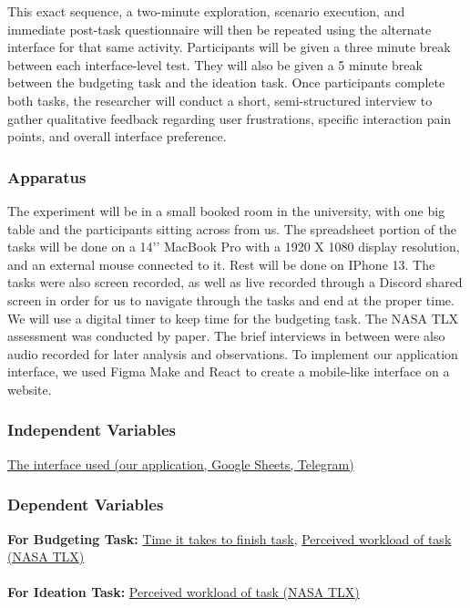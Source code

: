 \documentclass[12pt,a4paper]{article}
\begin{document}
\par
\indent
This exact sequence, a two-minute exploration, scenario execution, and immediate post-task questionnaire will then be repeated using the alternate interface for that same activity. Participants will be given a three minute break between each interface-level test. They will also be given a 5 minute break between the budgeting task and the ideation task. Once participants complete both tasks, the researcher will conduct a short, semi-structured interview to gather qualitative feedback regarding user frustrations, specific interaction pain points, and overall interface preference.


\subsubsection{Apparatus}

\par
\indent
The experiment will be in a small booked room in the university, with one big table and the participants sitting across from us. The spreadsheet portion of the tasks will be done on a 14’’ MacBook Pro with a 1920 X 1080 display resolution, and an external mouse connected to it. Rest will be done on IPhone 13. The tasks were also screen recorded, as well as live recorded through a Discord shared screen in order for us to navigate through the tasks and end at the proper time. We will use a digital timer to keep time for the budgeting task. The NASA TLX assessment was conducted by paper. The brief interviews in between were also audio recorded for later analysis and observations. To implement our application interface, we used Figma Make and React to create a mobile-like interface on a website.

\subsubsection{Independent Variables}
\noindent
\underline{The interface used (our application, Google Sheets, Telegram)}

\subsubsection{Dependent Variables}
\noindent
\textbf{For Budgeting Task:} \underline{Time it takes to finish task}, \underline{Perceived workload of task (NASA TLX)}
\\
\\
\textbf{For Ideation Task:}  \underline{Perceived workload of task (NASA TLX)}
\end{document}
